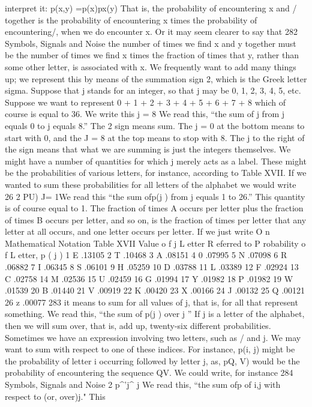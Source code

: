 {{{{{{{{{{{{{{interpret it:
p(x,y) =p(x)px(y)
That is, the probability of encountering x and / together is the
probability of encountering x times the probability of encountering/,
when we do encounter x. Or it may seem clearer to say that
282 Symbols, Signals and Noise
the number of times we find x and y together must be the number
of times we find x times the fraction of times that y, rather than
some other letter, is associated with x.
We frequently want to add many things up; we represent this
by means of the summation sign 2, which is the Greek letter
sigma. Suppose that j stands for an integer, so that j may be 0, 1,
2, 3, 4, 5, etc. Suppose we want to represent
0 + 1 + 2 + 3 + 4 + 5 + 6 + 7 + 8
which of course is equal to 36. We write this
j = 8
We read this, “the sum of j from j equals 0 to j equals 8.” The 2
sign means sum. The j = 0 at the bottom means to start with 0,
and the J = 8 at the top means to stop with 8. The j to the right
of the sign means that what we are summing is just the integers
themselves.
We might have a number of quantities for which j merely acts
as a label. These might be the probabilities of various letters, for
instance, according to Table XVII.
If we wanted to sum these probabilities for all letters of the
alphabet we would write
26
2 PU)
J= 1We read this “the sum ofp(j ) from j equals 1 to 26.” This quantity
is of course equal to 1. The fraction of times A occurs per letter
plus the fraction of times B occurs per letter, and so on, is the
fraction of times per letter that any letter at all occurs, and one
letter occurs per letter.
If we just write
O n Mathematical Notation
Table XVII
Value o f j L etter R eferred to P robability o f
L etter, p ( j )
1 E .13105
2 T .10468
3 A .08151
4 0 .07995
5 N .07098
6 R .06882
7 I .06345
8 S .06101
9 H .05259
10 D .03788
11 L .03389
12 F .02924
13 C .02758
14 M .02536
15 U .02459
16 G .01994
17 Y .01982
18 P .01982
19 W .01539
20 B .01440
21 V .00919
22 K .00420
23 X .00166
24 J .00132
25 Q .00121
26 z .00077
283
it means to sum for all values of j, that is, for all that represent
something. We read this, “the sum of p(j ) over j ” If j is a letter
of the alphabet, then we will sum over, that is, add up, twenty-six
different probabilities.
Sometimes we have an expression involving two letters, such as
/ and j. We may want to sum with respect to one of these indices.
For instance, p(i, j) might be the probability of letter i occurring
followed by letter j, as, p{Q, V) would be the probability of
encountering the sequence QV. We could write, for instance
284
Symbols, Signals and Noise
2 p^’j^
j
We read this, “the sum ofp of i,j with respect to (or, over)j." This
}}}}}}}}}}}}}}}
